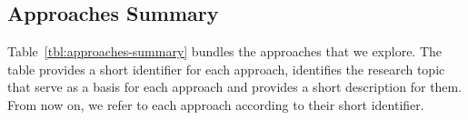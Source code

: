 

\subsection{Approaches Summary}


Table~\ref{tbl:approaches-summary} bundles the approaches that we explore.
The table provides a short identifier for each approach, identifies the research topic that serve as a basis for each approach and provides a short description for them. From now on, we refer to each approach according to their short identifier.


